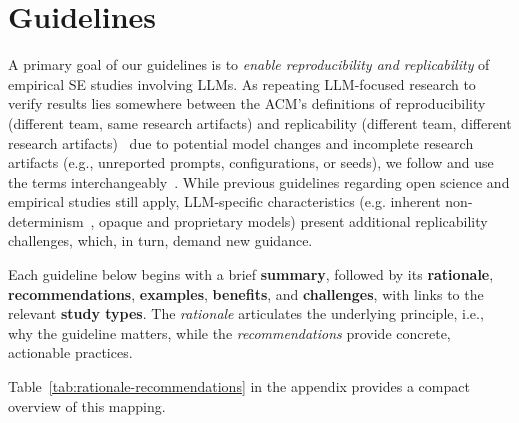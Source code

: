 \documentclass[smallextended]{svjour3}
\newif\ifpaper\papertrue
\begin{document}
\section{Guidelines}
\label{sec:guidelines}

A primary goal of our guidelines is to \emph{enable reproducibility and replicability} of empirical SE studies involving LLMs. As repeating LLM-focused research to verify results lies somewhere between the ACM's definitions of reproducibility (different team, same research artifacts) and replicability (different team, different research artifacts)~\cite{acm2020artifactreview} due to potential model changes and incomplete research artifacts (e.g., unreported prompts, configurations, or seeds), we follow \citeauthor{DBLP:journals/corr/abs-2510-25506} and use the terms interchangeably~\cite{DBLP:journals/corr/abs-2510-25506}. While previous guidelines regarding open science and empirical studies still apply, LLM-specific characteristics (e.g. inherent non-determinism~\cite{DBLP:conf/naacl/SongWLL25, YuanNondeterminismLLMInference}, opaque and proprietary models) present additional replicability challenges, which, in turn, demand new guidance.

Each guideline below begins with a brief \textbf{summary}, followed by its \textbf{rationale}, \textbf{recommendations}, \textbf{examples}, \textbf{benefits}, and \textbf{challenges}, with links to the relevant \textbf{study types}.
The \emph{rationale} articulates the underlying principle, i.e., why the guideline matters, while the \emph{recommendations} provide concrete, actionable practices.
\ifpaper
Table~\ref{tab:rationale-recommendations} in the appendix provides a compact overview of this mapping.
\fi
\end{document}
